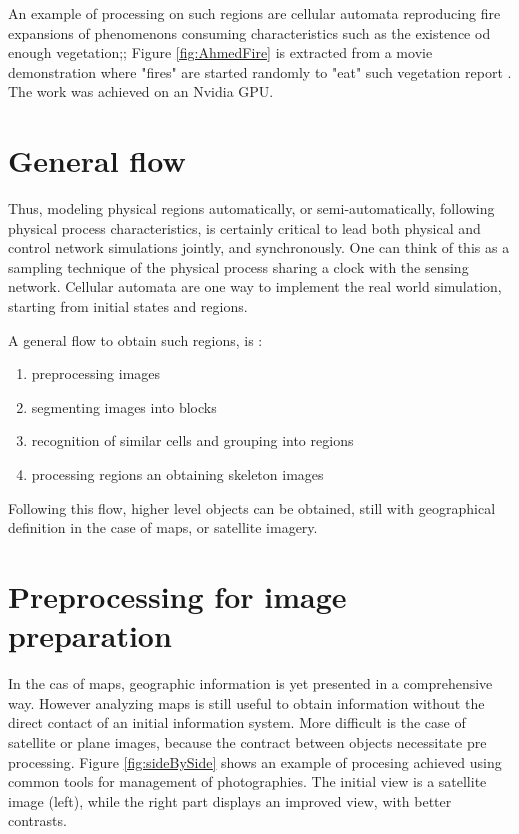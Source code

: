 An example of processing on such regions are cellular automata
reproducing fire expansions of phenomenons consuming characteristics such as the existence od enough vegetation;;
Figure \ref{fig:AhmedFire} is extracted from a
movie demonstration where "fires" are started randomly to "eat" such vegetation report \cite{AhmedFire}. The
work was achieved on an Nvidia GPU.


\section{General flow}

Thus,   modeling  physical regions automatically, or semi-automatically, following physical process 
characteristics, is certainly critical to lead both physical and control network  simulations jointly,
and synchronously. One can think of this as a sampling technique of the physical process sharing
a clock with the sensing network. Cellular automata are one way to implement the real world simulation,
starting from initial states and regions.


A general flow to obtain such regions, is :
\begin{enumerate}
\item  preprocessing  images 
\item segmenting images into blocks
\item recognition of similar cells and grouping into regions
\item processing regions an obtaining skeleton images
\end{enumerate}

Following this flow, higher level objects can be obtained, still with geographical definition in the case of
maps, or satellite imagery.

\section {Preprocessing for image preparation }

In the cas of maps, geographic information is yet presented in a comprehensive way. However analyzing maps is still useful
to obtain information without the direct contact of an initial information system.
More difficult is the case of satellite or plane images, because the contract between objects necessitate
pre processing. Figure \ref{fig:sideBySide} shows an example of procesing achieved using common tools
for management of photographies. The initial view is a satellite image (left), while the right part displays an improved
view, with better contrasts.


